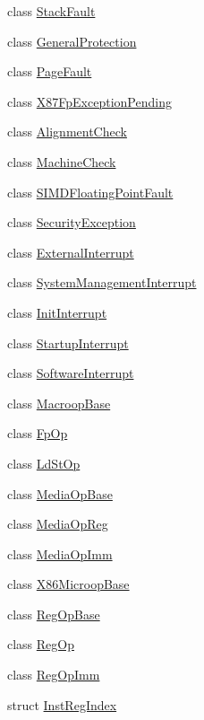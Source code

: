 \begin{DoxyCompactItemize}
class \hyperlink{classX86ISA_1_1StackFault}{StackFault}
\item 
class \hyperlink{classX86ISA_1_1GeneralProtection}{GeneralProtection}
\item 
class \hyperlink{classX86ISA_1_1PageFault}{PageFault}
\item 
class \hyperlink{classX86ISA_1_1X87FpExceptionPending}{X87FpExceptionPending}
\item 
class \hyperlink{classX86ISA_1_1AlignmentCheck}{AlignmentCheck}
\item 
class \hyperlink{classX86ISA_1_1MachineCheck}{MachineCheck}
\item 
class \hyperlink{classX86ISA_1_1SIMDFloatingPointFault}{SIMDFloatingPointFault}
\item 
class \hyperlink{classX86ISA_1_1SecurityException}{SecurityException}
\item 
class \hyperlink{classX86ISA_1_1ExternalInterrupt}{ExternalInterrupt}
\item 
class \hyperlink{classX86ISA_1_1SystemManagementInterrupt}{SystemManagementInterrupt}
\item 
class \hyperlink{classX86ISA_1_1InitInterrupt}{InitInterrupt}
\item 
class \hyperlink{classX86ISA_1_1StartupInterrupt}{StartupInterrupt}
\item 
class \hyperlink{classX86ISA_1_1SoftwareInterrupt}{SoftwareInterrupt}
\item 
class \hyperlink{classX86ISA_1_1MacroopBase}{MacroopBase}
\item 
class \hyperlink{classX86ISA_1_1FpOp}{FpOp}
\item 
class \hyperlink{classX86ISA_1_1LdStOp}{LdStOp}
\item 
class \hyperlink{classX86ISA_1_1MediaOpBase}{MediaOpBase}
\item 
class \hyperlink{classX86ISA_1_1MediaOpReg}{MediaOpReg}
\item 
class \hyperlink{classX86ISA_1_1MediaOpImm}{MediaOpImm}
\item 
class \hyperlink{classX86ISA_1_1X86MicroopBase}{X86MicroopBase}
\item 
class \hyperlink{classX86ISA_1_1RegOpBase}{RegOpBase}
\item 
class \hyperlink{classX86ISA_1_1RegOp}{RegOp}
\item 
class \hyperlink{classX86ISA_1_1RegOpImm}{RegOpImm}
\item 
struct \hyperlink{structX86ISA_1_1InstRegIndex}{InstRegIndex}
\item 

\end{DoxyCompactItemize}
